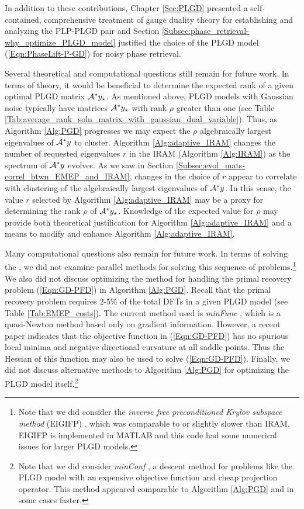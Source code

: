 In addition to these contributions, Chapter \ref{Sec:PLGD} presented a self-contained, comprehensive treatment of gauge duality theory for establishing and analyzing the PLP-PLGD pair and Section \ref{Subsec:phase_retrieval-why_optimize_PLGD_model} justified the choice of the PLGD model (\ref{Eqn:PhaseLift-P-GD}) for noisy phase retrieval.


Several theoretical and computational questions still remain for future work.  
In terms of theory, it would be beneficial to determine the expected rank of a given optimal PLGD matrix ${\mathcal A}^*y_\star$. 
As mentioned above, PLGD models with Gaussian noise typically have matrices ${\mathcal A}^*y_\star$ with rank $\rho$ greater than one (see Table \ref{Tab:average_rank_soln_matrix_with_gaussian_dual_variable}).
Thus, as Algorithm \ref{Alg:PGD} progresses we may expect the $\rho$ algebraically largest eigenvalues of ${\mathcal A}^*y$ to cluster.
Algorithm \ref{Alg:adaptive_IRAM} changes the number of requested eigenvalues $r$ in the IRAM (Algorithm \ref{Alg:IRAM}) as the spectrum of ${\mathcal A}^*y$ evolves.
As we saw in Section \ref{Subsec:evol_mats-correl_btwn_EMEP_and_IRAM}, changes in the choice of $r$ appear to correlate with clustering of the algebraically largest eigenvalues of ${\mathcal A}^*y$.
In this sense, the value $r$ selected by Algorithm \ref{Alg:adaptive_IRAM} may be a proxy for determining the rank $\rho$ of ${\mathcal A}^*y_\star$.
Knowledge of the expected value for $\rho$ may provide both theoretical justification for Algorithm \ref{Alg:adaptive_IRAM} and a means to modify and enhance Algorithm \ref{Alg:adaptive_IRAM}.


Many computational questions also remain for future work.
In terms of solving the \emep, we did not examine parallel methods for solving this sequence of problems.\footnote{
Note that we did consider the \textit{inverse free preconditioned Krylov subspace method} (EIGIFP) \cite{golub2002inverse}, which was comparable to or slightly slower than IRAM.  EIGIFP is implemented in MATLAB and this code had some numerical issues for larger PLGD models.
}
We also did not discuss optimizing the method for handling the primal recovery problem (\ref{Eqn:GD-PFD}) in Algorithm \ref{Alg:PGD}.
Recall that the primal recovery problem requires $2$-$5\%$ of the total DFTs in a given PLGD model (see Table \ref{Tab:EMEP_costs}).
The current method used is \textit{minFunc} \cite{schmidt2005minFunc}, which is a quasi-Newton method based only on gradient information.
However, a recent paper \cite{sun2016geometric} indicates that the objective function in (\ref{Eqn:GD-PFD}) has no spurious local minima and negative directional curvature at all saddle points.
Thus the Hessian of this function may also be used to solve (\ref{Eqn:GD-PFD}).
Finally, we did not discuss alternative methods to Algorithm \ref{Alg:PGD} for optimizing the PLGD model itself.\footnote{
Note that we did consider \textit{minConf} \cite{schmidt2008minConf}, a descent method for problems like the PLGD model with an expensive objective function and cheap projection operator.  This method appeared comparable to Algorithm \ref{Alg:PGD} and in some cases faster.
}






